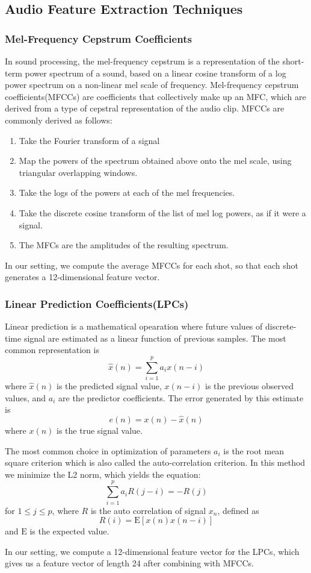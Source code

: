 \documentclass{article}
\begin{document}
\subsection{Audio Feature Extraction Techniques}
	\subsubsection{Mel-Frequency Cepstrum Coefficients}
	In sound processing, the mel-frequency cepstrum is a representation of the short-term power spectrum of a sound, based on a linear cosine transform of a log power spectrum on a non-linear mel scale of frequency. Mel-frequency cepstrum coefficients(MFCCs) are coefficients that collectively make up an MFC, which are derived from a type of cepstral representation of the audio clip. MFCCs are commonly derived as follows:
	\begin{enumerate}
	\item Take the Fourier transform of a signal
	\item Map the powers of the spectrum obtained above onto the mel scale, using triangular overlapping windows.
	\item Take the logs of the powers at each of the mel frequencies.
	\item Take the discrete cosine transform of the list of mel log powers, as if it were a signal.
	\item The MFCs are the amplitudes of the resulting spectrum.
	\end{enumerate}
	In our setting, we compute the average MFCCs for each shot, so that each shot generates a 12-dimensional feature vector.
	\subsubsection{Linear Prediction Coefficients(LPCs)}
	Linear prediction is a mathematical opearation where future values of discrete-time signal are estimated as a linear function of previous samples. The most common representation is 
	$$ \hat{x}(n) = \sum_{i=1}^{p} a_i x(n-i)$$
	where $\hat{x}(n)$ is the predicted signal value, $x(n-i)$ is the previous observed values, and $a_i$ are the predictor coefficients. The error generated by this estimate is 
	$$ e(n) = x(n) - \hat{x}(n)$$
	where $x(n)$ is the true signal value. \par
	The most common choice in optimization of parameters $a_i$ is the root mean square criterion which is also called the auto-correlation criterion. In this method we minimize the L2 norm, which yields the equation:
	$$\sum_{i=1}^{p} a_i R(j-i) = -R(j)$$
	for $1 \leq j \leq p$, where $R$ is the auto correlation of signal $x_n$, defined as
	$$R(i) = \mathrm{E}[x(n)x(n-i)]$$
	and $\mathrm{E}$ is the expected value.\par
	In our setting, we compute a 12-dimensional feature vector for the LPCs, which gives us a feature vector of length 24 after combining with MFCCs.
\end{document}
